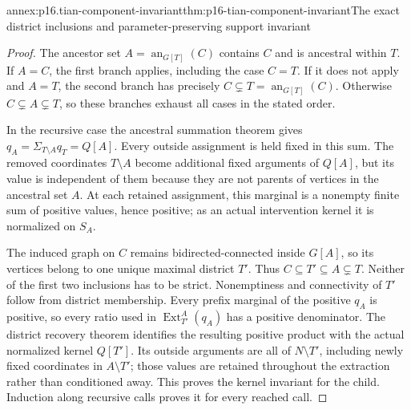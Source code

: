 \begin{annexitem}{annex:p16.tian-component-invariant}{thm:p16-tian-component-invariant}{The exact district inclusions and parameter-preserving support invariant}
\begin{proof}
The ancestor set \(A=\operatorname{an}_{G[T]}(C)\) contains
\(C\) and is ancestral within \(T\). If \(A=C\), the first
branch applies, including the case \(C=T\). If it does not
apply and \(A=T\), the second branch has precisely
\(C\subsetneq T=\operatorname{an}_{G[T]}(C)\).
Otherwise \(C\subsetneq A\subsetneq T\), so these branches
exhaust all cases in the stated order.

In the recursive case the ancestral summation theorem gives
\(q_A=\Sigma_{T\setminus A}q_T=Q[A]\). Every outside
assignment is held fixed in this sum. The removed coordinates
\(T\setminus A\) become additional fixed arguments of
\(Q[A]\), but its value is independent of them because they
are not parents of vertices in the ancestral set \(A\).
At each retained assignment, this marginal is a nonempty finite
sum of positive values, hence positive; as an actual intervention
kernel it is normalized on \(S_A\).

The induced graph on \(C\) remains bidirected-connected inside
\(G[A]\), so its vertices belong to one unique maximal district
\(T'\). Thus
\(C\subseteq T'\subseteq A\subsetneq T\).
Neither of the first two inclusions has to be strict. Nonemptiness
and connectivity of \(T'\) follow from district membership.
Every prefix marginal of the positive \(q_A\) is positive,
so every ratio used in \(\operatorname{Ext}^A_{T'}(q_A)\)
has a positive denominator. The district recovery theorem identifies
the resulting positive product with the actual normalized kernel
\(Q[T']\). Its outside arguments are all of \(N\setminus T'\),
including newly fixed coordinates in \(A\setminus T'\); those
values are retained throughout the extraction rather than conditioned
away. This proves the kernel invariant for the child. Induction
along recursive calls proves it for every reached call.
\end{proof}
\end{annexitem}

